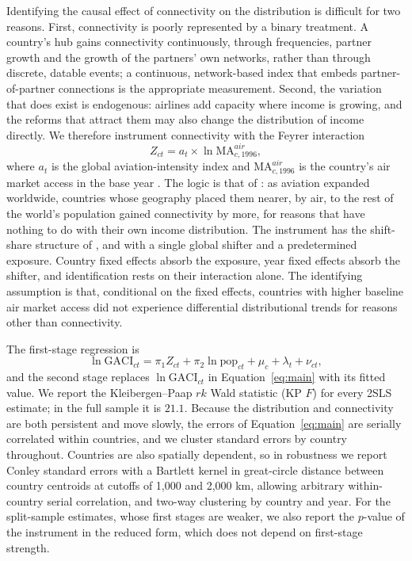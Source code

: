 Identifying the causal effect of connectivity on the distribution is difficult for two reasons. First, connectivity is poorly represented by a binary treatment. A country's hub gains connectivity continuously, through frequencies, partner growth and the growth of the partners' own networks, rather than through discrete, datable events; a continuous, network-based index that embeds partner-of-partner connections is the appropriate measurement. Second, the variation that does exist is endogenous: airlines add capacity where income is growing, and the reforms that attract them may also change the distribution of income directly. We therefore instrument connectivity with the Feyrer interaction
\begin{equation}
Z_{ct} = a_t \times \ln\mathrm{MA}^{air}_{c,1996},
\label{eq:iv}
\end{equation}
where $a_t$ is the global aviation-intensity index and $\mathrm{MA}^{air}_{c,1996}$ is the country's air market access in the base year \citep{Feyrer_2019}. The logic is that of \citet{Feyrer_2019}: as aviation expanded worldwide, countries whose geography placed them nearer, by air, to the rest of the world's population gained connectivity by more, for reasons that have nothing to do with their own income distribution. The instrument has the shift-share structure of \citet{GoldsmithPinkham_2020}, \citet{Adao_2019} and \citet{Borusyak_2022} with a single global shifter and a predetermined exposure. Country fixed effects absorb the exposure, year fixed effects absorb the shifter, and identification rests on their interaction alone. The identifying assumption is that, conditional on the fixed effects, countries with higher baseline air market access did not experience differential distributional trends for reasons other than connectivity.

The first-stage regression is
\begin{equation}
\ln\mathrm{GACI}_{ct} = \pi_1 Z_{ct} + \pi_2 \ln\text{pop}_{ct} + \mu_c + \lambda_t + \nu_{ct},
\label{eq:first}
\end{equation}
and the second stage replaces $\ln\mathrm{GACI}_{ct}$ in Equation~\eqref{eq:main} with its fitted value. We report the Kleibergen--Paap $rk$ Wald statistic (KP $F$) for every 2SLS estimate; in the full sample it is $21.1$. Because the distribution and connectivity are both persistent and move slowly, the errors of Equation~\eqref{eq:main} are serially correlated within countries, and we cluster standard errors by country throughout. Countries are also spatially dependent, so in robustness we report Conley standard errors \citep{Conley_1999} with a Bartlett kernel in great-circle distance between country centroids at cutoffs of 1{,}000 and 2{,}000 km, allowing arbitrary within-country serial correlation, and two-way clustering by country and year. For the split-sample estimates, whose first stages are weaker, we also report the $p$-value of the instrument in the reduced form, which does not depend on first-stage strength.

